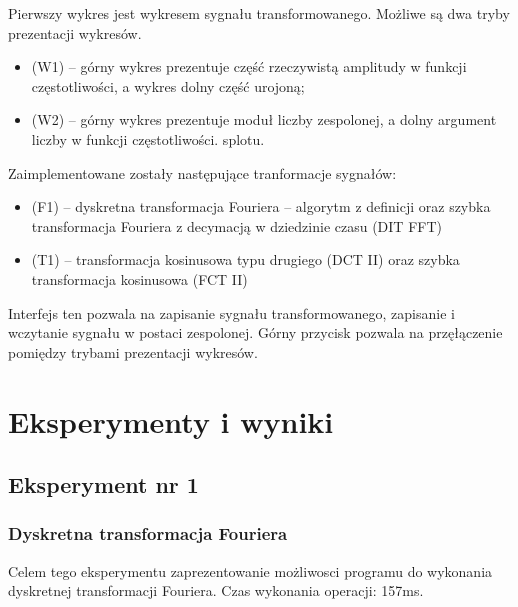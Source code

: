 \documentclass[12pt]{article}
\begin{document}
Pierwszy wykres jest wykresem sygnału transformowanego.
Możliwe są dwa tryby prezentacji wykresów. 
\begin{itemize}
\item (W1) – górny wykres prezentuje część rzeczywistą amplitudy w funkcji
częstotliwości, a wykres dolny część urojoną;
\item (W2) – górny wykres prezentuje moduł liczby zespolonej, a dolny argument liczby
w funkcji częstotliwości.
 splotu.
\end{itemize}
Zaimplementowane zostały następujące tranformacje sygnałów:
\begin{itemize}
\item (F1) – dyskretna transformacja Fouriera – algorytm z definicji oraz szybka
transformacja Fouriera z decymacją w dziedzinie czasu (DIT FFT)
\item (T1) – transformacja kosinusowa typu drugiego (DCT II) oraz szybka transformacja
kosinusowa (FCT II)
\end{itemize}

Interfejs ten pozwala na zapisanie sygnału transformowanego, zapisanie i wczytanie sygnału w postaci zespolonej. Górny przycisk pozwala na przęłączenie pomiędzy trybami prezentacji wykresów.
\section{Eksperymenty i wyniki}



\subsection{Eksperyment nr 1 }
\subsubsection{Dyskretna transformacja Fouriera}
Celem tego eksperymentu zaprezentowanie możliwosci programu do wykonania dyskretnej transformacji Fouriera.
Czas wykonania operacji: 157ms.
\end{document}
